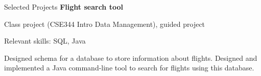 \begin{rubric}{Selected Projects}
\entry*[2018] %
	\textbf{Flight search tool}
	\par Class project (CSE344 Intro Data Management), guided project
	\par Relevant skills: SQL, Java
	\par Designed schema for a database to store information about flights. Designed and implemented a Java command-line tool to search for flights using this database.

\end{rubric}

